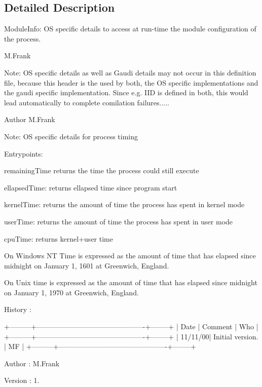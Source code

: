 \subsection{Detailed Description}
Module\+Info\+: OS specific details to access at run-\/time the module configuration of the process.

M.\+Frank

Note\+: OS specific details as well as Gaudi details may not occur in this definition file, because this header is the used by both, the OS specific implementations and the gaudi specific implementation. Since e.\+g. I\+ID is defined in both, this would lead automatically to complete comilation failures.....

\begin{DoxyAuthor}{Author}
M.\+Frank
\end{DoxyAuthor}
Note\+: OS specific details for process timing

Entrypoints\+:
\begin{DoxyItemize}
\item remaining\+Time returns the time the process could still execute
\item ellapsed\+Time\+: returns ellapsed time since program start
\item kernel\+Time\+: returns the amount of time the process has spent in kernel mode
\item user\+Time\+: returns the amount of time the process has spent in user mode
\item cpu\+Time\+: returns kernel+user time
\end{DoxyItemize}

On Windows NT Time is expressed as the amount of time that has elapsed since midnight on January 1, 1601 at Greenwich, England.

On Unix time is expressed as the amount of time that has elapsed since midnight on January 1, 1970 at Greenwich, England.

History \+:


\begin{DoxyPre}
+---------+----------------------------------------------+--------+
|    Date |                 Comment                      | Who    |
+---------+----------------------------------------------+--------+
| 11/11/00| Initial version.                             | MF     |
+---------+----------------------------------------------+--------+
\end{DoxyPre}
 \begin{DoxyAuthor}{Author}
\+: M.\+Frank 
\end{DoxyAuthor}
\begin{DoxyVersion}{Version}
\+: 1. 
\end{DoxyVersion}


